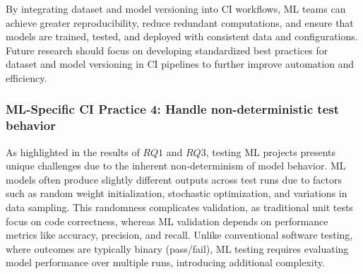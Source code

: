 By integrating dataset and model versioning into CI workflows, ML teams can achieve greater reproducibility, reduce redundant computations, and ensure that models are trained, tested, and deployed with consistent data and configurations. Future research should focus on developing standardized best practices for dataset and model versioning in CI pipelines to further improve automation and efficiency.

\subsubsection*{\textbf{ML-Specific CI Practice 4:} Handle non-deterministic test behavior}

As highlighted in the results of $RQ1$ and $RQ3$, testing ML projects presents unique challenges due to the inherent non-determinism of model behavior. ML models often produce slightly different outputs across test runs due to factors such as random weight initialization, stochastic optimization, and variations in data sampling. This randomness complicates validation, as traditional unit tests focus on code correctness, whereas ML validation depends on performance metrics like accuracy, precision, and recall. Unlike conventional software testing, where outcomes are typically binary (pass/fail), ML testing requires evaluating model performance over multiple runs, introducing additional complexity.

